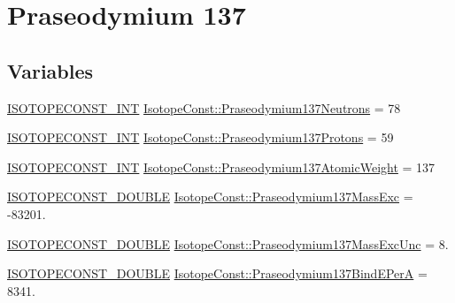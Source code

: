 \hypertarget{group___isotope_const-_praseodymium-_pr137}{}\section{Praseodymium 137}
\label{group___isotope_const-_praseodymium-_pr137}
\subsection*{Variables}
\begin{DoxyCompactItemize}
\item 
\mbox{\hyperlink{group___isotope_const-_macros_ga5f18360b3e99483a35c32d789e62621c}{I\+S\+O\+T\+O\+P\+E\+C\+O\+N\+S\+T\+\_\+\+I\+NT}} \mbox{\hyperlink{group___isotope_const-_praseodymium-_pr137_gab208e73f446b9f12a18bd36ff8ef1ca6}{Isotope\+Const\+::\+Praseodymium137\+Neutrons}} = 78
\item 
\mbox{\hyperlink{group___isotope_const-_macros_ga5f18360b3e99483a35c32d789e62621c}{I\+S\+O\+T\+O\+P\+E\+C\+O\+N\+S\+T\+\_\+\+I\+NT}} \mbox{\hyperlink{group___isotope_const-_praseodymium-_pr137_ga983023130a61cc6ea2b378a532abd34b}{Isotope\+Const\+::\+Praseodymium137\+Protons}} = 59
\item 
\mbox{\hyperlink{group___isotope_const-_macros_ga5f18360b3e99483a35c32d789e62621c}{I\+S\+O\+T\+O\+P\+E\+C\+O\+N\+S\+T\+\_\+\+I\+NT}} \mbox{\hyperlink{group___isotope_const-_praseodymium-_pr137_ga63dbe0ab768b8c4ada74b626986f4ced}{Isotope\+Const\+::\+Praseodymium137\+Atomic\+Weight}} = 137
\item 
\mbox{\hyperlink{group___isotope_const-_macros_ga8f45a7272ce02c0b4c65c44636ed719a}{I\+S\+O\+T\+O\+P\+E\+C\+O\+N\+S\+T\+\_\+\+D\+O\+U\+B\+LE}} \mbox{\hyperlink{group___isotope_const-_praseodymium-_pr137_ga604664550019c8f8ffb7fec8d9021458}{Isotope\+Const\+::\+Praseodymium137\+Mass\+Exc}} = -\/83201.
\item 
\mbox{\hyperlink{group___isotope_const-_macros_ga8f45a7272ce02c0b4c65c44636ed719a}{I\+S\+O\+T\+O\+P\+E\+C\+O\+N\+S\+T\+\_\+\+D\+O\+U\+B\+LE}} \mbox{\hyperlink{group___isotope_const-_praseodymium-_pr137_ga6a84f962f0e3669a234f5847b8f008b4}{Isotope\+Const\+::\+Praseodymium137\+Mass\+Exc\+Unc}} = 8.
\item 
\mbox{\hyperlink{group___isotope_const-_macros_ga8f45a7272ce02c0b4c65c44636ed719a}{I\+S\+O\+T\+O\+P\+E\+C\+O\+N\+S\+T\+\_\+\+D\+O\+U\+B\+LE}} \mbox{\hyperlink{group___isotope_const-_praseodymium-_pr137_gae4cc1bc6914d27ef594de0dca0874e7d}{Isotope\+Const\+::\+Praseodymium137\+Bind\+E\+PerA}} = 8341.

\end{DoxyCompactItemize}
